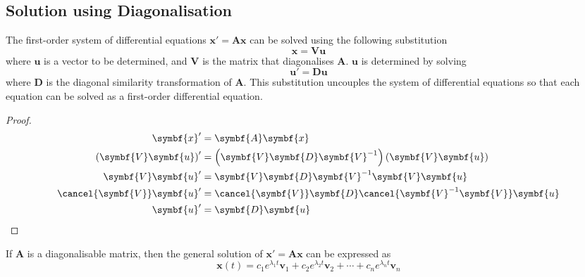 \documentclass{article}
\begin{document}
\subsection{Solution using Diagonalisation}
\begin{theorem}
    The first-order system of differential equations
    \(\symbf{x}' = \symbf{A} \symbf{x}\) can be solved using the
    following substitution
    \begin{equation*}
        \symbf{x}=\symbf{V}\symbf{u}
    \end{equation*}
    where \(\symbf{u}\) is a vector to be determined, and
    \(\symbf{V}\) is the matrix that diagonalises \(\symbf{A}\).
    \(\symbf{u}\) is determined by solving
    \begin{equation*}
        \symbf{u}' = \symbf{D} \symbf{u}
    \end{equation*}
    where \(\symbf{D}\) is the diagonal similarity
    transformation of \(\symbf{A}\). This substitution uncouples the
    system of differential equations so that each equation can be solved
    as a first-order differential equation.
\end{theorem}
\begin{proof}
    \begingroup
    \allowdisplaybreaks
    \begin{align*}
        \symbf{x}'                         & = \symbf{A} \symbf{x}                                                               \\
        \left( \symbf{V}\symbf{u} \right)' & = \left( \symbf{V}\symbf{D} \symbf{V}^{-1} \right)\left( \symbf{V}\symbf{u} \right) \\
        \symbf{V}\symbf{u}'                & = \symbf{V}\symbf{D} \symbf{V}^{-1} \symbf{V}\symbf{u}                              \\
        \cancel{\symbf{V}}\symbf{u}'       & = \cancel{\symbf{V}}\symbf{D} \cancel{\symbf{V}^{-1} \symbf{V}}\symbf{u}            \\
        \symbf{u}'                         & = \symbf{D} \symbf{u}
    \end{align*}
    \endgroup
\end{proof}
\begin{theorem}
    If \(\symbf{A}\) is a diagonalisable matrix, then the general
    solution of \(\symbf{x}' = \symbf{A} \symbf{x}\) can be
    expressed as
    \begin{equation*}
        \symbf{x}\left( t \right) = c_1 e^{\lambda_1 t} \symbf{v}_1 + c_2 e^{\lambda_2 t} \symbf{v}_2 + \cdots + c_n e^{\lambda_n t} \symbf{v}_n
    \end{equation*}
\end{theorem}
\end{document}
